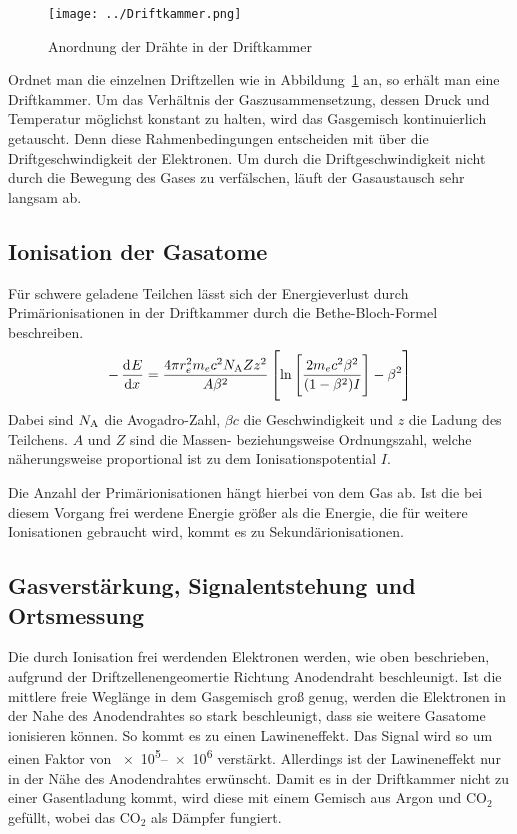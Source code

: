 \documentclass[11pt, ngerman, fleqn, DIV=15, headinclude, BCOR=2cm]{scrreprt}
\begin{document}
\begin{figure}
	\centering
	\texttt{[image: ../Driftkammer.png]}
	\caption{%
		Anordnung der Drähte in der Driftkammer
	}
	\label{fig:aufbau_driftkammer}
\end{figure}

Ordnet man die einzelnen Driftzellen wie in
Abbildung~\ref{fig:aufbau_driftkammer} an, so erhält man eine Driftkammer.
Um das Verhältnis der Gaszusammensetzung, dessen Druck und Temperatur möglichst
konstant zu halten, wird das Gasgemisch kontinuierlich getauscht.
Denn diese Rahmenbedingungen entscheiden mit über die Driftgeschwindigkeit der
Elektronen.
Um durch die Driftgeschwindigkeit nicht durch die Bewegung des Gases zu
verfälschen, läuft der Gasaustausch sehr langsam ab.

\subsection{Ionisation der Gasatome}
Für schwere geladene Teilchen lässt sich der Energieverlust durch
Primärionisationen in der Driftkammer durch die Bethe-Bloch-Formel beschreiben.
\[
    -\dod Ex = \frac{4 \pi r^2_e m_e c^2 N_\text{A} Z z^2}{A \beta^2}\sbr{\ln\sbr{\frac{2m_e c^2 \beta^2}{(1-\beta^2)I}}-\beta^2}
\]
Dabei sind $N_\text A$ die Avogadro-Zahl, $\beta c$ die Geschwindigkeit und $z$
die Ladung des Teilchens. $A$ und $Z$ sind die Massen- beziehungsweise
Ordnungszahl, welche näherungsweise proportional ist zu dem
Ionisationspotential $I$.

Die Anzahl der Primärionisationen hängt hierbei von dem Gas ab.
Ist die bei diesem Vorgang frei werdene Energie größer als die Energie, die für
weitere Ionisationen gebraucht wird, kommt es zu Sekundärionisationen.

\subsection{Gasverstärkung, Signalentstehung und Ortsmessung}
Die durch Ionisation frei werdenden Elektronen werden, wie oben beschrieben,
aufgrund der Driftzellenengeomertie Richtung Anodendraht beschleunigt.
Ist die mittlere freie Weglänge in dem Gasgemisch groß genug, werden die
Elektronen in der Nahe des Anodendrahtes so stark beschleunigt, dass sie
weitere Gasatome ionisieren können.
So kommt es zu einen Lawineneffekt.
Das Signal wird so um einen Faktor von \numrange{e5}{e6} verstärkt.
Allerdings ist der Lawineneffekt nur in der Nähe des Anodendrahtes erwünscht.
Damit es in der Driftkammer nicht zu einer Gasentladung kommt, wird diese mit
einem Gemisch aus Argon und $\text{CO}_2$ gefüllt, wobei das $\text{CO}_2$ als
Dämpfer fungiert.
\end{document}
